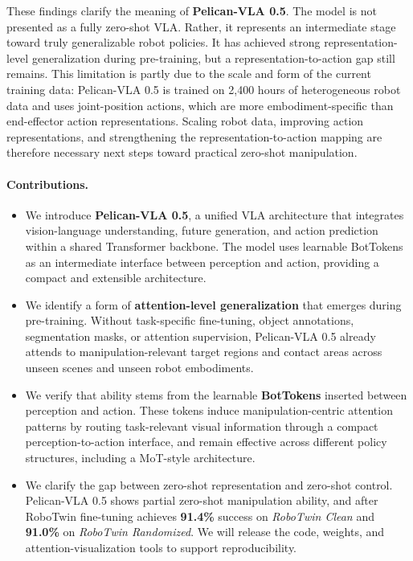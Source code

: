 \documentclass[a4paper,table]{extarticle}
\begin{document}
These findings clarify the meaning of \textbf{Pelican-VLA 0.5}. The model is not presented as a fully zero-shot VLA. Rather, it represents an intermediate stage toward truly generalizable robot policies. It has achieved strong representation-level generalization during pre-training, but a representation-to-action gap still remains. This limitation is partly due to the scale and form of the current training data: Pelican-VLA 0.5 is trained on 2,400 hours of heterogeneous robot data and uses joint-position actions, which are more embodiment-specific than end-effector action representations. Scaling robot data, improving action representations, and strengthening the representation-to-action mapping are therefore necessary next steps toward practical zero-shot manipulation.

\paragraph{Contributions.}
\begin{itemize}
    \item  We introduce \textbf{Pelican-VLA 0.5}, a unified VLA architecture that integrates vision-language understanding, future generation, and action prediction within a shared Transformer backbone. The model uses learnable BotTokens as an intermediate interface between perception and action, providing a compact and extensible architecture.

    \item We identify a form of \textbf{attention-level generalization} that emerges during pre-training. Without task-specific fine-tuning, object annotations, segmentation masks, or attention supervision, Pelican-VLA 0.5 already attends to manipulation-relevant target regions and contact areas across unseen scenes and unseen robot embodiments.
    
    \item We verify that ability stems from the learnable \textbf{BotTokens} inserted between perception and action. These tokens induce manipulation-centric attention patterns by routing task-relevant visual information through a compact perception-to-action interface, and remain effective across different policy structures, including a MoT-style architecture.
    
    \item We clarify the gap between zero-shot representation and zero-shot control. Pelican-VLA 0.5 shows partial zero-shot manipulation ability, and after RoboTwin fine-tuning achieves \textbf{91.4\%} success on \emph{RoboTwin Clean} and \textbf{91.0\%} on \emph{RoboTwin Randomized}. We will release the code, weights, and attention-visualization tools to support reproducibility.
\end{itemize}
\end{document}
